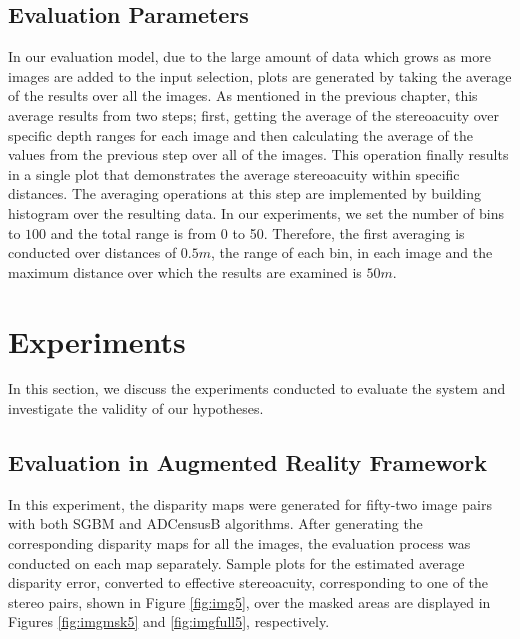 \subsection{Evaluation Parameters}
In our evaluation model, due to the large amount of data which grows as more images are added to the input selection, 
plots are generated by taking the average of the results over all the images. As mentioned in the previous chapter, this average results from two steps; 
first, getting the average of the stereoacuity over specific
depth ranges for each image and then calculating the average of the values from the previous step over all of the images. This operation finally results in a single plot
that demonstrates the average stereoacuity within specific distances.
The averaging operations at this step are implemented by building histogram over the resulting data. 
In our experiments, we set the number of bins to $100$ and the total range is from 0 to 50. Therefore, the first averaging is conducted over distances of $0.5m$, the range
of each bin, in each image and the maximum distance over which the results are 
examined is $50m$.


\section{Experiments}
In this section, we discuss the experiments conducted to evaluate the system and investigate the validity of our hypotheses.

\subsection{Evaluation in Augmented Reality Framework}

In this experiment, the disparity maps 
were generated for fifty-two image pairs with both SGBM and ADCensusB algorithms. 
After generating the corresponding disparity maps for all the images, 
the evaluation process was conducted on each map separately.\newline
Sample plots for the estimated average disparity error, converted to effective stereoacuity, corresponding to one of the stereo pairs, shown in Figure \ref{fig:img5},
over the masked areas are displayed in Figures \ref{fig:imgmsk5} and \ref{fig:imgfull5}, respectively.

